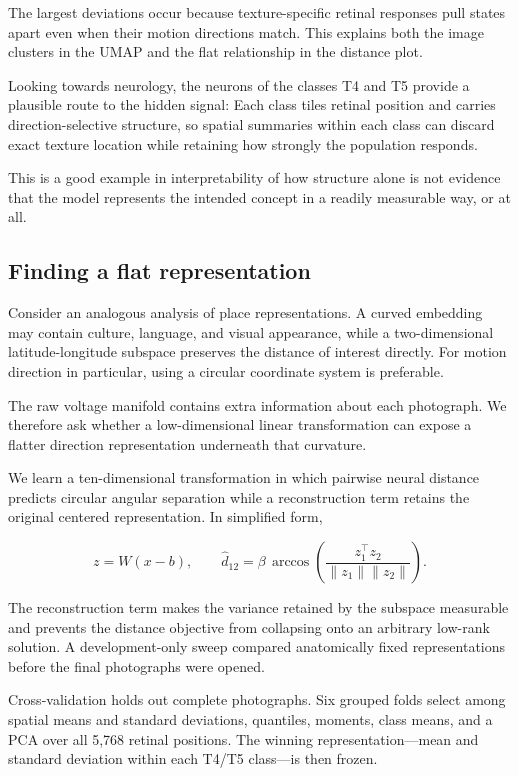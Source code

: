 \documentclass[11pt]{article}
\begin{document}
The largest deviations occur because texture-specific retinal responses pull states apart even when their motion directions match. This explains both the image clusters in the UMAP and the flat relationship in the distance plot.

Looking towards neurology, the neurons of the classes T4 and T5 provide a plausible route to the hidden signal: Each class tiles retinal position and carries direction-selective structure, so spatial summaries within each class can discard exact texture location while retaining how strongly the population responds.

This is a good example in interpretability of how structure alone is not evidence that the model represents the intended concept in a readily measurable way, or at all.

\subsection{Finding a flat representation}

Consider an analogous analysis of place representations. A curved embedding may contain culture, language, and visual appearance, while a two-dimensional latitude-longitude subspace preserves the distance of interest directly. For motion direction in particular, using a circular coordinate system is preferable.

The raw voltage manifold contains extra information about each photograph. We therefore ask whether a low-dimensional linear transformation can expose a flatter direction representation underneath that curvature.

We learn a ten-dimensional transformation in which pairwise neural distance predicts circular angular separation while a reconstruction term retains the original centered representation. In simplified form,

\[
z = W(x-b), \qquad
\widehat d_{12}=\beta\,\arccos\!\left(\frac{z_1^\top z_2}{\lVert z_1\rVert\lVert z_2\rVert}\right).
\]

The reconstruction term makes the variance retained by the subspace measurable and prevents the distance objective from collapsing onto an arbitrary low-rank solution. A development-only sweep compared anatomically fixed representations before the final photographs were opened.

Cross-validation holds out complete photographs. Six grouped folds select among spatial means and standard deviations, quantiles, moments, class means, and a PCA over all 5,768 retinal positions. The winning representation---mean and standard deviation within each T4/T5 class---is then frozen.
\end{document}
